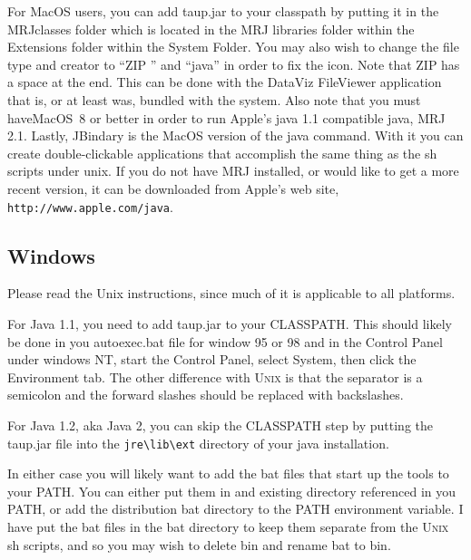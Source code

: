 For MacOS users, you can add taup.jar to your classpath by putting it in the
MRJclasses folder which is located in the MRJ libraries folder within the Extensions folder within the System Folder. You may also wish to change the file type and creator to ``ZIP '' and
``java'' in order to fix the icon. Note that ZIP has a space at the end. This can be done with the DataViz FileViewer application that is, or at least was, bundled with the system. Also note that you must haveMacOS~8 or better in order to run Apple's java 1.1 compatible java, MRJ 2.1. Lastly, JBindary is the MacOS version of the java command. With it you can create double-clickable applications that accomplish the same thing as the sh scripts under unix. If you do not have MRJ installed, or would like to get a more recent version, it can be downloaded from Apple's web site, \verb+http://www.apple.com/java+.

\subsection{Windows}

Please read the Unix instructions, since much of it is applicable to all platforms.

For Java 1.1, you need to add taup.jar to your CLASSPATH. This should likely 
be done in you autoexec.bat file for window 95 or 98 and in the Control Panel 
under windows NT, start the Control Panel, select System, then click the 
Environment tab. The other difference with \textsc{Unix} is that the separator is a semicolon and the forward slashes should be replaced with backslashes.

For Java 1.2, aka Java 2, you can skip the CLASSPATH step by putting the taup.jar file into the \verb+jre\lib\ext+ directory of your java installation.
 
In either case you will likely want to add the bat files that start up the 
tools to your PATH. You can either put them in and existing directory 
referenced in you PATH, or add the distribution bat directory to the 
PATH environment variable. I have put the bat files in the bat directory to 
 keep them separate from the \textsc{Unix} sh scripts, and so you may wish 
to delete bin and rename bat to bin.
